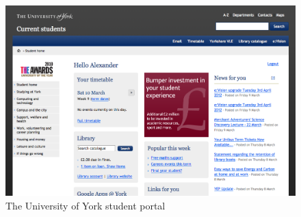 \documentclass[twoside]{scrartcl}
\begin{document}










\begin{figure}
  \centering
  \includegraphics[width=0.9\linewidth]{images/2012_03_10_yorkacuk_students.png}
  \caption{The University of York student portal}
  \label{yorkacuk_student_portal}
\end{figure}
\end{document}
